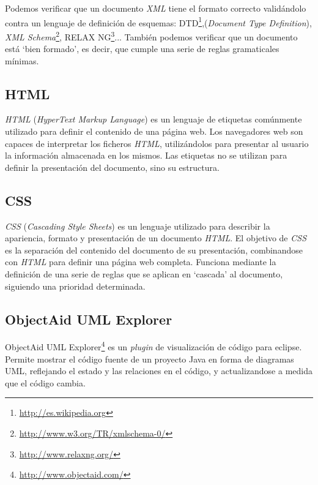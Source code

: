 Podemos verificar que un documento \emph{XML} tiene el formato correcto validándolo contra un lenguaje de definición de esquemas: DTD\footnote{\url{http://es.wikipedia.org}},(\emph{Document Type Definition}), \emph{XML Schema}\footnote{\url{http://www.w3.org/TR/xmlschema-0/}}, RELAX NG\footnote{\url{http://www.relaxng.org/}}...
También podemos verificar que un documento está `bien formado', es decir, que cumple una serie de reglas gramaticales mínimas.

\subsection{HTML}
\emph{HTML} (\emph{HyperText Markup Language}) es un lenguaje de etiquetas comúnmente utilizado para definir el contenido de una página web.
Los navegadores web son capaces de interpretar los ficheros \emph{HTML}, utilizándolos para presentar al usuario la información almacenada en los mismos.
Las etiquetas no se utilizan para definir la presentación del documento, sino su estructura.

\subsection{CSS}
\emph{CSS} (\emph{Cascading Style Sheets}) es un lenguaje utilizado para describir la apariencia, formato y presentación de un documento \emph{HTML}.
El objetivo de \emph{CSS} es la separación del contenido del documento de su presentación, combinandose con \emph{HTML} para definir una página web completa.
Funciona mediante la definición de una serie de reglas que se aplican en `cascada' al documento, siguiendo una prioridad determinada.

\subsection{ObjectAid UML Explorer}
ObjectAid UML Explorer\footnote{\url{http://www.objectaid.com/}} es un \emph{plugin} de visualización de código para eclipse.
Permite mostrar el código fuente de un proyecto Java en forma de diagramas UML, reflejando el estado y las relaciones en el código, y actualizandose a medida que el código cambia.